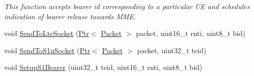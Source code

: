 \begin{DoxyCompactItemize}
\begin{DoxyCompactList}\small\item\em This function accepts bearer id corresponding to a particular UE and schedules indication of bearer release towards M\+ME. \end{DoxyCompactList}\item 
void \hyperlink{classns3_1_1EpcEnbApplication_a793f953acd337fdccf43f468e1f5ea63}{Send\+To\+Lte\+Socket} (\hyperlink{classns3_1_1Ptr}{Ptr}$<$ \hyperlink{classns3_1_1Packet}{Packet} $>$ packet, uint16\+\_\+t rnti, uint8\+\_\+t bid)
\item 
void \hyperlink{classns3_1_1EpcEnbApplication_a550ef90073047a928a2e31a39f91f26b}{Send\+To\+S1u\+Socket} (\hyperlink{classns3_1_1Ptr}{Ptr}$<$ \hyperlink{classns3_1_1Packet}{Packet} $>$ packet, uint32\+\_\+t teid)
\item 
void \hyperlink{classns3_1_1EpcEnbApplication_aad22a048da4d7fc9a3f054bdb745e088}{Setup\+S1\+Bearer} (uint32\+\_\+t teid, uint16\+\_\+t rnti, uint8\+\_\+t bid)
\end{DoxyCompactItemize}
